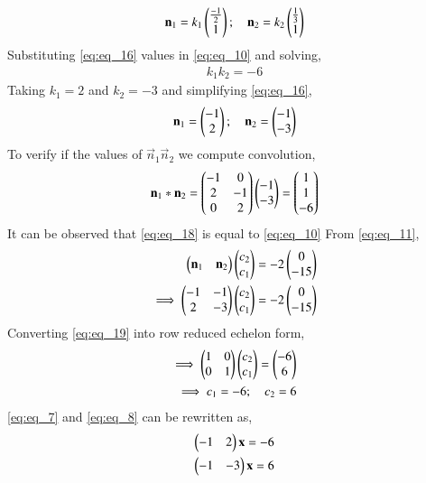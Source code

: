 \documentclass[journal,12pt,twocolumn]{IEEEtran}
\begin{document}
\begin{align}
    \mathbf{n}_1=k_1\begin{pmatrix}\frac{-1}{2} \\ 1\end{pmatrix}; \quad \mathbf{n}_2=k_2\begin{pmatrix}\frac{1}{3} \\ 1\end{pmatrix} \label{eq:eq_16}
\end{align}
Substituting \eqref{eq:eq_16} values in \eqref{eq:eq_10} and solving,
\begin{align}
    k_1k_2=-6 \nonumber
\end{align}
Taking $k_1 = 2$ and $k_2 = -3$ and simplifying \eqref{eq:eq_16},
\begin{align} \label{eq:eq_17}
    \mathbf{n}_1 = \begin{pmatrix}-1 \\ 2\end{pmatrix}; \quad \mathbf{n}_2 = \begin{pmatrix}-1 \\ -3\end{pmatrix} 
\end{align}
To verify if the values of $\vec{n}_1 \vec{n}_2$ we compute convolution,
\begin{align}
    \mathbf{n}_1*\mathbf{n}_2=\begin{pmatrix}-1 & 0 \\ 2 & -1 \\ 0 & 2\end{pmatrix}\begin{pmatrix}-1 \\ -3\end{pmatrix} = \begin{pmatrix}1 \\ 1 \\ -6\end{pmatrix} \label{eq:eq_18}
\end{align}
It can be observed that \eqref{eq:eq_18} is equal to \eqref{eq:eq_10}
From \eqref{eq:eq_11},
\begin{align}
    \begin{pmatrix}\mathbf{n}_1 & \mathbf{n}_2\end{pmatrix}\begin{pmatrix}c_2 \\ c_1\end{pmatrix} = -2\begin{pmatrix}0 \\ -15\end{pmatrix} \nonumber \\
    \implies \begin{pmatrix}-1 & -1 \\ 2 & -3\end{pmatrix}\begin{pmatrix}c_2 \\ c_1\end{pmatrix} = -2\begin{pmatrix}0 \\ -15\end{pmatrix} \label{eq:eq_19}
\end{align}
Converting \eqref{eq:eq_19} into row reduced echelon form,
\begin{align}
    \implies \begin{pmatrix}1 & 0 \\ 0 & 1\end{pmatrix}\begin{pmatrix}c_2 \\ c_1\end{pmatrix} = \begin{pmatrix}-6 \\ 6\end{pmatrix} \nonumber\\
    \implies c_1 = -6; \quad c_2 = 6 \label{eq:eq_20}
\end{align}
\eqref{eq:eq_7} and \eqref{eq:eq_8} can be rewritten as,
\begin{align}
    \begin{pmatrix}-1 & 2\end{pmatrix}\mathbf{x} = -6 \\
    \begin{pmatrix}-1 & -3\end{pmatrix}\mathbf{x} = 6
\end{align}
\end{document}

